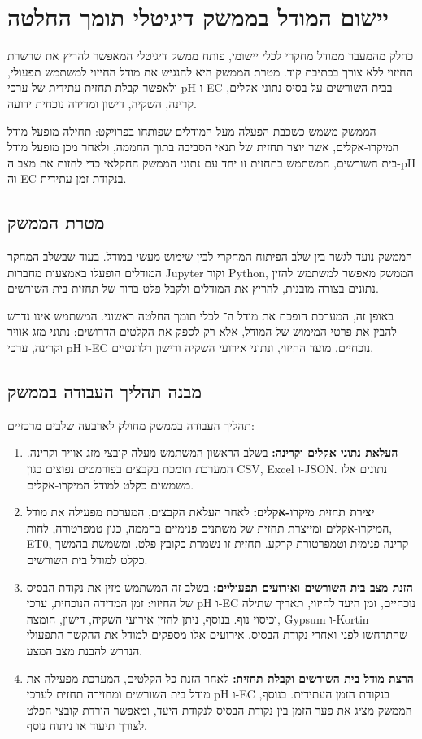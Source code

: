\section{יישום המודל בממשק דיגיטלי תומך החלטה}
כחלק מהמעבר ממודל מחקרי לכלי יישומי, פותח ממשק דיגיטלי המאפשר להריץ את שרשרת החיזוי ללא צורך בכתיבת קוד. מטרת הממשק היא להנגיש את מודל החיזוי למשתמש תפעולי, ולאפשר קבלת תחזית עתידית של ערכי pH ו-EC בבית השורשים על בסיס נתוני אקלים, קרינה, השקיה, דישון ומדידה נוכחית ידועה.

הממשק משמש כשכבת הפעלה מעל המודלים שפותחו בפרויקט: תחילה מופעל מודל המיקרו-אקלים, אשר יוצר תחזית של תנאי הסביבה בתוך החממה, ולאחר מכן מופעל מודל בית השורשים, המשתמש בתחזית זו יחד עם נתוני הממשק החקלאי כדי לחזות את מצב ה-pH וה-EC בנקודת זמן עתידית.

\subsection{מטרת הממשק}
הממשק נועד לגשר בין שלב הפיתוח המחקרי לבין שימוש מעשי במודל. בעוד שבשלב המחקר המודלים הופעלו באמצעות מחברות Jupyter וקוד Python, הממשק מאפשר למשתמש להזין נתונים בצורה מובנית, להריץ את המודלים ולקבל פלט ברור של תחזית בית השורשים.

באופן זה, המערכת הופכת את מודל ה־\SoftSensor{} לכלי תומך החלטה ראשוני. המשתמש אינו נדרש להבין את פרטי המימוש של המודל, אלא רק לספק את הקלטים הדרושים: נתוני מזג אוויר וקרינה, ערכי pH ו-EC נוכחיים, מועד החיזוי, ונתוני אירועי השקיה ודישון רלוונטיים.

\subsection{מבנה תהליך העבודה בממשק}
תהליך העבודה בממשק מחולק לארבעה שלבים מרכזיים:

\begin{enumerate}
    \item \textbf{העלאת נתוני אקלים וקרינה:} בשלב הראשון המשתמש מעלה קובצי מזג אוויר וקרינה. המערכת תומכת בקבצים בפורמטים נפוצים כגון CSV, Excel ו-JSON. נתונים אלו משמשים כקלט למודל המיקרו-אקלים.
    \item \textbf{יצירת תחזית מיקרו-אקלים:} לאחר העלאת הקבצים, המערכת מפעילה את מודל המיקרו-אקלים ומייצרת תחזית של משתנים פנימיים בחממה, כגון טמפרטורה, לחות, ET0, קרינה פנימית וטמפרטורת קרקע. תחזית זו נשמרת כקובץ פלט, ומשמשת בהמשך כקלט למודל בית השורשים.
    \item \textbf{הזנת מצב בית השורשים ואירועים תפעוליים:} בשלב זה המשתמש מזין את נקודת הבסיס של החיזוי: זמן המדידה הנוכחית, ערכי pH ו-EC נוכחיים, זמן היעד לחיזוי, תאריך שתילה וכיסוי נוף. בנוסף, ניתן להזין אירועי השקיה, דישון, חומצה, Gypsum ו-Kortin שהתרחשו לפני ואחרי נקודת הבסיס. אירועים אלו מספקים למודל את ההקשר התפעולי הנדרש להבנת מצב המצע.
    \item \textbf{הרצת מודל בית השורשים וקבלת תחזית:} לאחר הזנת כל הקלטים, המערכת מפעילה את מודל בית השורשים ומחזירה תחזית לערכי pH ו-EC בנקודת הזמן העתידית. בנוסף, הממשק מציג את פער הזמן בין נקודת הבסיס לנקודת היעד, ומאפשר הורדת קובצי הפלט לצורך תיעוד או ניתוח נוסף.
\end{enumerate}

